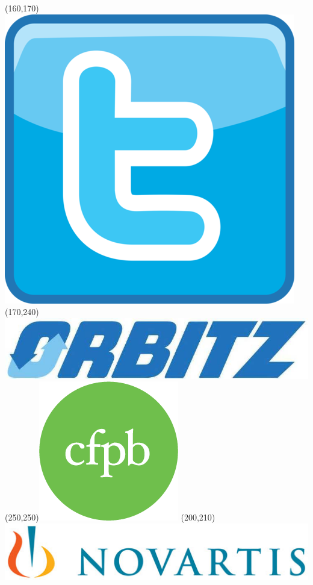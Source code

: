 \begin{frame}
\Put(160,170){\includegraphics[scale=.08]{../common/pics/R_using_logos/twitter}}
\Put(170,240){\includegraphics[scale=.1]{../common/pics/R_using_logos/orbitz}}
\Put(250,250){\includegraphics[scale=.12]{../common/pics/R_using_logos/cfpb}}
\Put(200,210){\includegraphics[scale=.6]{../common/pics/R_using_logos/novartis}}

\end{frame}
